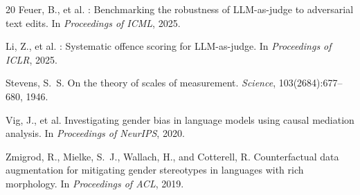 \documentclass[11pt,a4paper]{article}
\begin{document}
\begin{thebibliography}{20}
Feuer, B., et al.
: Benchmarking the robustness of {LLM}-as-judge to adversarial text edits.
\newblock In \emph{Proceedings of ICML}, 2025.

Li, Z., et al.
: Systematic offence scoring for {LLM}-as-judge.
\newblock In \emph{Proceedings of ICLR}, 2025.

Stevens, S.~S.
\newblock On the theory of scales of measurement.
\newblock \emph{Science}, 103(2684):677--680, 1946.

Vig, J., et al.
\newblock Investigating gender bias in language models using causal mediation analysis.
\newblock In \emph{Proceedings of NeurIPS}, 2020.

Zmigrod, R., Mielke, S.~J., Wallach, H., and Cotterell, R.
\newblock Counterfactual data augmentation for mitigating gender stereotypes in languages with rich morphology.
\newblock In \emph{Proceedings of ACL}, 2019.

\end{thebibliography}
\end{document}
